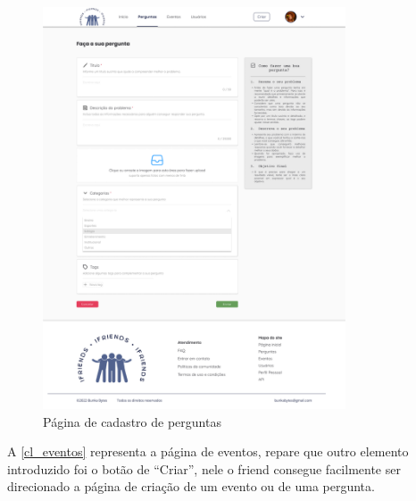 \begin{figure}[htb]
\centering
\caption{\label{cadastro_perguntas} Página de cadastro de perguntas}
\includegraphics[width=0.8\textwidth]{anexos/Imagens_Prototipo/com_login/cadastro_perguntas.png}
\end{figure}
\FloatBarrier

A \autoref{cl_eventos} representa a página de eventos, repare que outro elemento introduzido foi o botão de ``Criar'', nele o \gls{friend} consegue facilmente ser direcionado a página de criação de um evento ou de uma pergunta.

